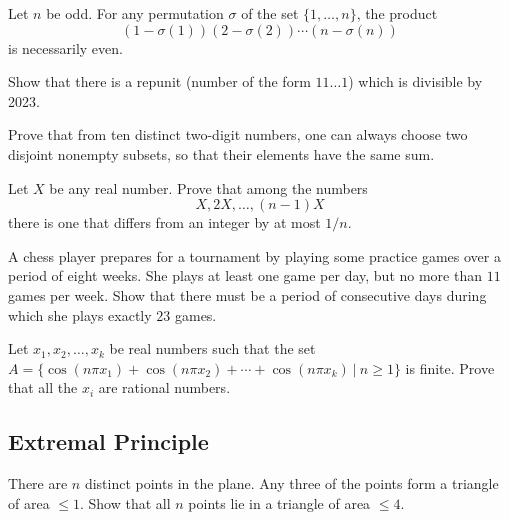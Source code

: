 \documentclass[12pt]{article}
\begin{document}
        \begin{exercise}
            Let \(n\) be odd.
            For any permutation \(\sigma\) of the set \(\{1,\ldots,n\}\), the product
            \[(1-\sigma(1))(2-\sigma(2))\cdots(n-\sigma(n))\]
            is necessarily even.
        \end{exercise}

        \begin{exercise}
            Show that there is a repunit (number of the form \(11\ldots 1\)) which is divisible by 2023.
        \end{exercise}

        \begin{exercise}
            Prove that from ten distinct two-digit numbers, one can always choose two disjoint nonempty subsets, so that their elements have the same sum.
        \end{exercise}
            
        \begin{exercise}
             Let $X$ be any real number. Prove that among the numbers \[X,2X,\dots,(n-1)X\] there is one that differs from an integer by at most $1/n$. 
        \end{exercise}
            
        \begin{exercise}
            A chess player prepares for a tournament by playing some practice games over a period of eight weeks. She plays at least one game per day, but no more than $11$ games per week. Show that there must be a period of consecutive days during which she plays exactly $23$ games.
        \end{exercise}

        \begin{exercise}
            Let $x_1,x_2,\dots,x_k$ be real numbers such that the set $A=\{\cos(n\pi x_1)+\cos(n\pi x_2)+\cdots+\cos(n\pi x_k)\  |\  n\geq 1\}$ is finite. Prove that all the $x_i$ are rational numbers.
        \end{exercise}

    \subsection{Extremal Principle}

        \begin{exercise}
            There are $n$ distinct points in the plane. Any three of the points form a triangle of area $\leq 1$. Show that all $n$ points lie in a triangle of area $\leq 4$. 
        \end{exercise}
\end{document}
